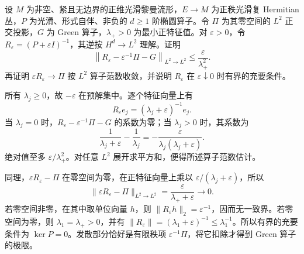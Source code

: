\begin{exercise}\label{g3:ex:green-resolvent-regularization}
	设 \(M\) 为非空、紧且无边界的正维光滑黎曼流形，\(E\to M\) 为正秩光滑复 Hermitian 丛，\(P\) 为光滑、形式自伴、非负的 \(d\ge1\) 阶椭圆算子。令 \(\Pi\) 为其零空间的 \(L^2\) 正交投影，\(G\) 为 Green 算子，\(\lambda_+>0\) 为最小正特征值。对 \(\varepsilon>0\)，令 \(R_\varepsilon=(P+\varepsilon I)^{-1}\)，其逆按 \(H^d\to L^2\) 理解。证明
	\[
		\left\|R_\varepsilon-\varepsilon^{-1}\Pi-G\right\|_{L^2\to L^2}
		\le\frac{\varepsilon}{\lambda_+^2}.
	\]
	再证明 \(\varepsilon R_\varepsilon\to\Pi\) 按 \(L^2\) 算子范数收敛，并说明 \(R_\varepsilon\) 在 \(\varepsilon\downarrow0\) 时有界的充要条件。
\end{exercise}
\begin{solution}
	所有 \(\lambda_j\ge0\)，故 \(-\varepsilon\) 在预解集中。逐个特征向量上有
	\[
		R_\varepsilon e_j=(\lambda_j+\varepsilon)^{-1}e_j.
	\]
	当 \(\lambda_j=0\) 时，\(R_\varepsilon-\varepsilon^{-1}\Pi-G\) 的系数为零；当 \(\lambda_j>0\) 时，其系数为
	\[
		\frac1{\lambda_j+\varepsilon}-\frac1{\lambda_j}
		=-\frac{\varepsilon}{\lambda_j(\lambda_j+\varepsilon)}.
	\]
	绝对值至多 \(\varepsilon/\lambda_+^2\)。对任意 \(L^2\) 展开求平方和，便得所述算子范数估计。

	同理，\(\varepsilon R_\varepsilon-\Pi\) 在零空间为零，在正特征向量上乘以 \(\varepsilon/(\lambda_j+\varepsilon)\)，所以
	\[
		\|\varepsilon R_\varepsilon-\Pi\|_{L^2\to L^2}
		=\frac{\varepsilon}{\lambda_++\varepsilon}\longrightarrow0.
	\]
	若零空间非零，在其中取单位向量 \(h\)，则 \(\|R_\varepsilon h\|_2=\varepsilon^{-1}\)，因而无一致界。若零空间为零，则 \(\lambda_1=\lambda_+>0\)，并有 \(\|R_\varepsilon\|=(\lambda_1+\varepsilon)^{-1}\le\lambda_1^{-1}\)。所以有界的充要条件为 \(\ker P=0\)。发散部分恰好是有限秩项 \(\varepsilon^{-1}\Pi\)，将它扣除才得到 Green 算子的极限。
\end{solution}

